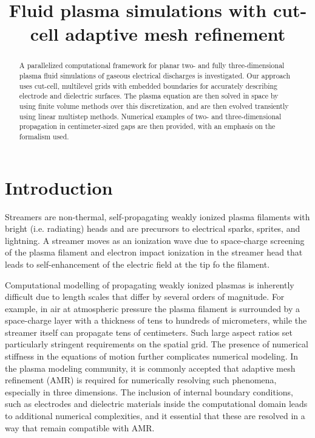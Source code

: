 \documentclass[3p]{elsarticle}
\title{Fluid plasma simulations with cut-cell adaptive mesh refinement}
\begin{document}
\begin{abstract}
A parallelized computational framework for planar two- and fully three-dimensional plasma fluid simulations of gaseous electrical discharges is investigated. Our approach uses cut-cell, multilevel grids with embedded boundaries for accurately describing electrode and dielectric surfaces. The plasma equation are then solved in space by using finite volume methods over this discretization, and are then evolved transiently using linear multistep methods. Numerical examples of two- and three-dimensional propagation in centimeter-sized gaps are then provided, with an emphasis on the formalism used. 
\end{abstract}
\maketitle

\section{Introduction}
Streamers are non-thermal, self-propagating weakly ionized plasma filaments with bright (i.e. radiating) heads and are precursors to electrical sparks, sprites, and lightning. A streamer moves as an ionization wave due to space-charge screening of the plasma filament and electron impact ionization in the streamer head that leads to self-enhancement of the electric field at the tip fo the filament.

Computational modelling of propagating weakly ionized plasmas is inherently difficult due to length scales that differ by several orders of magnitude. For example, in air at atmospheric pressure the plasma filament is surrounded by a space-charge layer with a thickness of tens to hundreds of micrometers, while the streamer itself can propagate tens of centimeters. Such large aspect ratios set particularly stringent requirements on the spatial grid. The presence of numerical stiffness in the equations of motion further complicates numerical modeling. In the plasma modeling community, it is commonly accepted that adaptive mesh refinement (AMR) is required for numerically resolving such phenomena, especially in three dimensions. The inclusion of internal boundary conditions, such as electrodes and dielectric materials inside the computational domain leads to additional numerical complexities, and it essential that these are resolved in a way that remain compatible with AMR. 
\end{document}
